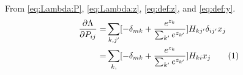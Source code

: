 \documentclass[]{article}
\newcommand\numberthis{\addtocounter{equation}{1}\tag{\theequation}}
\begin{document}
From \eqref{eq:Lambda:P}, \eqref{eq:Lambda:z}, \eqref{eq:def:z}, and \eqref{eq:def:y}.
\begin{align*}
	\frac{\partial{\Lambda}}{\partial P_{ij}} =&\sum_{k,j^{\prime}} [-\delta_{mk} + \frac{e^{z_k}}{\sum_{k^{\prime}} e^{z_{k^{\prime}}}}] H_{k{j^{\prime}}} \delta_{ij^{\prime}} x_j\\
	=&\sum_{k,} [-\delta_{mk} + \frac{e^{z_k}}{\sum_{k^{\prime}} e^{z_{k^{\prime}}}}] H_{ki}  x_j \numberthis \label{eq:Lambda:PP}
\end{align*}


\printglossaries




\end{document}
